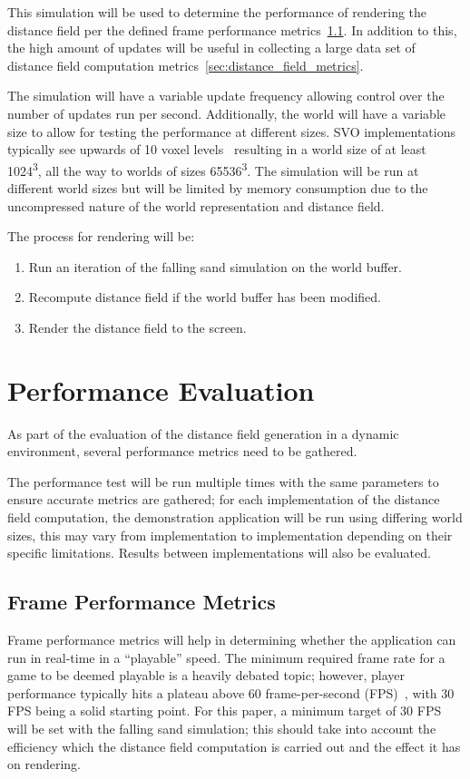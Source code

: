 This simulation will be used to determine the performance of rendering the distance field per the defined frame
performance metrics~\ref{sec:frame_perf_metrics}. In addition to this, the high amount of updates will be useful in
collecting a large data set of distance field computation metrics~\ref{sec:distance_field_metrics}.

The simulation will have a variable update frequency allowing control over the number of updates run per second.
Additionally, the world will have a variable size to allow for testing the performance at different sizes. SVO
implementations typically see upwards of 10 voxel levels~\cite{laine2010efficient} resulting in a world size of at least
1024\textsuperscript{3}, all the way to worlds of sizes 65536\textsuperscript{3}. The simulation will be run at
different world sizes but will be limited by memory consumption due to the uncompressed nature of the world
representation and distance field.

The process for rendering will be:

\begin{enumerate}
    \item Run an iteration of the falling sand simulation on the world buffer.
    \item Recompute distance field if the world buffer has been modified.
    \item Render the distance field to the screen.
\end{enumerate}

\section{Performance Evaluation}
As part of the evaluation of the distance field generation in a dynamic environment, several performance metrics need to
be gathered.

The performance test will be run multiple times with the same parameters to ensure accurate metrics are gathered; for
each implementation of the distance field computation, the demonstration application will be run using differing world
sizes, this may vary from implementation to implementation depending on their specific limitations. Results between
implementations will also be evaluated.

\subsection{Frame Performance Metrics}\label{sec:frame_perf_metrics}
Frame performance metrics will help in determining whether the application can run in real-time in a ``playable'' speed.
The minimum required frame rate for a game to be deemed playable is a heavily debated topic; however, player performance
typically hits a plateau above 60 frame-per-second (FPS)~\cite{claypool2007frame}, with 30 FPS being a solid starting
point. For this paper, a minimum target of 30 FPS will be set with the falling sand simulation; this should take into
account the efficiency which the distance field computation is carried out and the effect it has on rendering.

